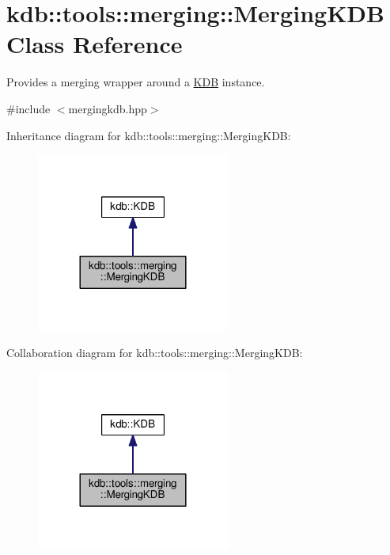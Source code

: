\hypertarget{classkdb_1_1tools_1_1merging_1_1MergingKDB}{}\section{kdb\+:\+:tools\+:\+:merging\+:\+:Merging\+K\+DB Class Reference}
\label{classkdb_1_1tools_1_1merging_1_1MergingKDB}


Provides a merging wrapper around a \hyperlink{classkdb_1_1KDB}{K\+DB} instance.  




{\ttfamily \#include $<$mergingkdb.\+hpp$>$}



Inheritance diagram for kdb\+:\+:tools\+:\+:merging\+:\+:Merging\+K\+DB\+:
\nopagebreak
\begin{figure}[H]
\begin{center}
\leavevmode
\includegraphics[width=180pt]{classkdb_1_1tools_1_1merging_1_1MergingKDB__inherit__graph}
\end{center}
\end{figure}


Collaboration diagram for kdb\+:\+:tools\+:\+:merging\+:\+:Merging\+K\+DB\+:
\nopagebreak
\begin{figure}[H]
\begin{center}
\leavevmode
\includegraphics[width=180pt]{classkdb_1_1tools_1_1merging_1_1MergingKDB__coll__graph}
\end{center}
\end{figure}
